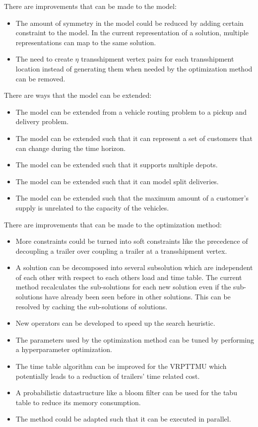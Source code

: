 There are improvements that can be made to the model:
\begin{itemize}
\item The amount of symmetry in the model could be reduced by adding certain constraint to the model.
In the current representation of a solution, multiple representations can map to the same solution.
\item The need to create $\eta$ transshipment vertex pairs for each transshipment location instead of generating them when needed by the optimization method can be removed.
\end{itemize}

There are ways that the model can be extended:
\begin{itemize}
  \item The model can be extended from a vehicle routing problem to a pickup and delivery problem.
  \item The model can be extended such that it can represent a set of customers that can change during the time horizon.
  \item The model can be extended such that it supports multiple depots.
  \item The model can be extended such that it can model split deliveries.
  \item The model can be extended such that the maximum amount of a customer's supply is  unrelated to the capacity of the vehicles.
\end{itemize}

There are improvements that can be made to the optimization method:
\begin{itemize}
\item More constraints could be turned into soft constraints like the precedence of decoupling a trailer over coupling a trailer at a transshipment vertex.
\item A solution can be decomposed into several subsolution which are independent of each other with respect to each others load and time table.
The current method recalculates the sub-solutions for each new solution even if the sub-solutions have already been seen before in other solutions.
This can be resolved by caching the sub-solutions of solutions.
\item New operators can be developed to speed up the search heuristic.
\item The parameters used by the optimization method can be tuned by performing a  hyperparameter optimization.
\item The time table algorithm can be improved for the VRPTTMU which potentially leads to a reduction of trailers' time related cost.
\item A probabilistic datastructure like a bloom filter can be used for the tabu table to reduce its memory consumption.
\item The method could be adapted such that it can be executed in parallel.
\end{itemize}

